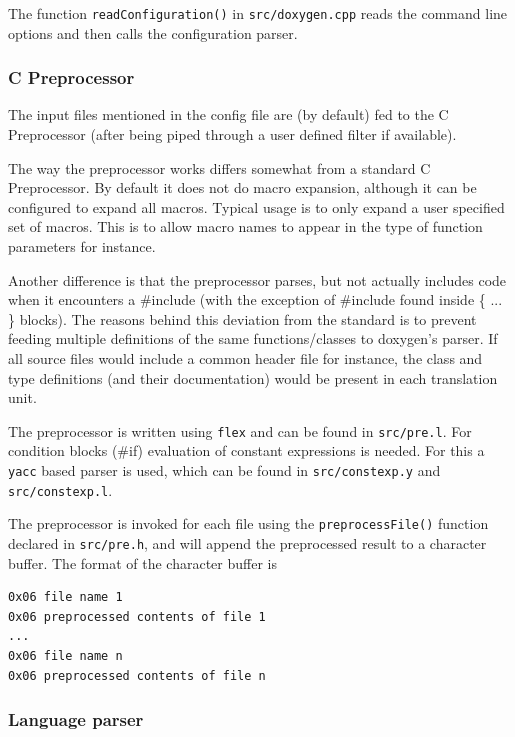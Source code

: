The function {\tt readConfiguration()} in {\tt src/doxygen.cpp} reads the command line options and then calls the configuration parser.

\subsubsection*{C Preprocessor}

The input files mentioned in the config file are (by default) fed to the C Preprocessor (after being piped through a user defined filter if available).

The way the preprocessor works differs somewhat from a standard C Preprocessor. By default it does not do macro expansion, although it can be configured to expand all macros. Typical usage is to only expand a user specified set of macros. This is to allow macro names to appear in the type of function parameters for instance.

Another difference is that the preprocessor parses, but not actually includes code when it encounters a \#include (with the exception of \#include found inside \{ ... \} blocks). The reasons behind this deviation from the standard is to prevent feeding multiple definitions of the same functions/classes to doxygen's parser. If all source files would include a common header file for instance, the class and type definitions (and their documentation) would be present in each translation unit.

The preprocessor is written using {\tt flex} and can be found in {\tt src/pre.l}. For condition blocks (\#if) evaluation of constant expressions is needed. For this a {\tt yacc} based parser is used, which can be found in {\tt src/constexp.y} and {\tt src/constexp.l}.

The preprocessor is invoked for each file using the {\tt preprocessFile()} function declared in {\tt src/pre.h}, and will append the preprocessed result to a character buffer. The format of the character buffer is



\footnotesize\begin{verbatim}
0x06 file name 1 
0x06 preprocessed contents of file 1
...
0x06 file name n
0x06 preprocessed contents of file n
\end{verbatim}
\normalsize


\subsubsection*{Language parser}

